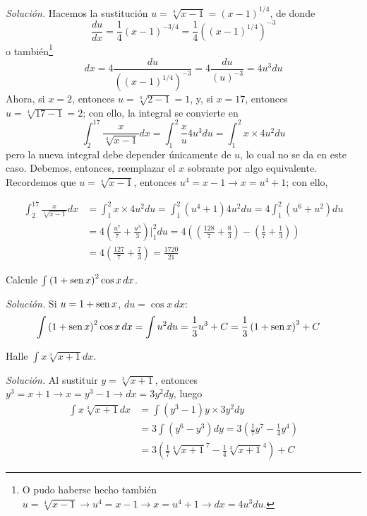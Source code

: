 \emph{Solución.} Hacemos la sustitución $u=\sqrt[4]{x-1}=(x-1)^{1/4}$, de donde
\[
  \frac{du}{dx}=\frac{1}{4}(x-1)^{-3/4}=\frac{1}{4}\left((x-1)^{1/4}\right)^{-3}
\]
o también\footnote{O pudo haberse hecho también $u=\sqrt[4]{x-1}\rightarrow u^{4}=x-1\rightarrow x=u^{4}+1\rightarrow dx=4u^{3}du.$}
\[
  dx=4\frac{du}{\left((x-1)^{1/4}\right)^{-3}}=4\frac{du}{\left(u\right)^{-3}}=4 u^3du
\]
Ahora, si $x=2$, entonces $u=\sqrt[4]{2-1}=1$, y, si $x=17$, entonces $u=\sqrt[4]{17-1}=2$; con ello, la integral se convierte en
\[
  \int_{2}^{17}\frac{x}{\sqrt[4]{x-1}}dx=\int_{1}^{2}\frac{x}{u}4u^{3}du=\int_{1}^{2}x\times 4u^{2}du
\]
pero la nueva integral debe depender únicamente de $u$, lo cual no se da en este caso. Debemos, entonces, reemplazar el $x$ sobrante por algo equivalente. Recordemos que $u=\sqrt[4]{x-1}$, entonces $u^{4}=x-1\rightarrow x=u^{4}+1$; con ello,

{\small
  \begin{align*}
    \int_{2}^{17}\frac{x}{\sqrt[4]{x-1}}dx&=\int_{1}^{2}x\times 4u^{2}du=\int_{1}^{2}\left( u^{4}+1\right)4u^{2}du=4\int_{1}^{2}\left( u^{6}+u^{2}\right) du\\
    &=4\left( \frac{u^{7}}{7}+\frac{u^{3}}{3}\right)\Big\vert_{1}^{2}du=4\left( \left(
      \frac{128}{7}+\frac{8}{3}\right) -\left( \frac{1}{7}+\frac{1}{3}\right)
    \right)\\
    &=4\left( \frac{127}{7}+\frac{7}{3}\right) =\frac{1720}{21}
  \end{align*}
}

\begin{ejemplo}
  Calcule $\int \left( 1+\operatorname{sen} x\right) ^{2}\cos x\,dx$.
\end{ejemplo}

\emph{Solución.} Si $u=1+\operatorname{sen} x$, $du=\cos x\,dx$:
{\small
  \begin{align*}
    \int \left( 1+\operatorname{sen} x\right)^{2}\cos x\,dx
    &=\int u^{2}du=\frac{1}{3}u^{3}+C=\frac{1}{3}\left( 1+\operatorname{sen} x\right) ^{3}+C
  \end{align*}
}
\clearpage

\begin{ejemplo}
  Halle $\int x\sqrt[3]{x+1}dx$.
\end{ejemplo}

\emph{Solución.} Al sustituir $y=\sqrt[3]{x+1}$, entonces $y^{3}=x+1\rightarrow x=y^{3}-1\rightarrow dx=3y^{2}dy$, luego
\begin{align*}
  \int x\sqrt[3]{x+1}dx&=\int \left( y^{3}-1\right) y \times 3y^{2}dy\\
  &=3\int \left(y^{6}-y^{3}\right) dy=3\left( \frac{1}{7}y^{7}-\frac{1}{4}y^{4}\right)\\
  &=3\left( \frac{1}{7}\sqrt[3]{x+1}^{7}-\frac{1}{4}\sqrt[3]{x+1}^{4}\right) +C
\end{align*}

